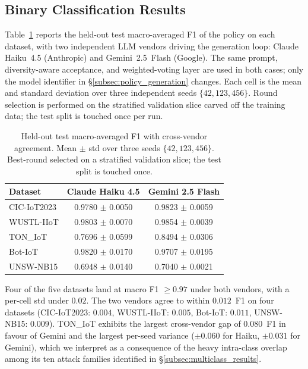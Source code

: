 \subsection{Binary Classification Results}
\label{subsec:binary_results}

Table~\ref{tab:policy_refinement} reports the held-out test macro-averaged F1
of the policy on each dataset, with two independent LLM vendors driving the
generation loop: Claude Haiku~4.5 (Anthropic) and Gemini~2.5~Flash (Google).
The same prompt, diversity-aware acceptance, and weighted-voting layer are
used in both cases; only the model identifier in
\S\ref{subsec:policy_generation} changes. Each cell is the mean and standard
deviation over three independent seeds $\{42, 123, 456\}$. Round selection
is performed on the stratified validation slice carved off the training
data; the test split is touched once per run.

\begin{table}[H]
\centering
\caption{Held-out test macro-averaged F1 with cross-vendor agreement.
  Mean $\pm$ std over three seeds $\{42, 123, 456\}$.
  Best-round selected on a stratified validation slice; the test split is touched once.}
\label{tab:policy_refinement}
\begin{tabular}{lcc}
\toprule
\textbf{Dataset} & \textbf{Claude Haiku 4.5} & \textbf{Gemini 2.5 Flash} \\
\midrule
CIC-IoT2023 & 0.9780 $\pm$ 0.0050 & 0.9823 $\pm$ 0.0059 \\
WUSTL-IIoT  & 0.9803 $\pm$ 0.0070 & 0.9854 $\pm$ 0.0039 \\
TON\_IoT    & 0.7696 $\pm$ 0.0599 & 0.8494 $\pm$ 0.0306 \\
Bot-IoT     & 0.9820 $\pm$ 0.0170 & 0.9707 $\pm$ 0.0195 \\
UNSW-NB15   & 0.6948 $\pm$ 0.0140 & 0.7040 $\pm$ 0.0021 \\
\bottomrule
\end{tabular}
\end{table}

Four of the five datasets land at macro F1 $\geq 0.97$ under both vendors,
with a per-cell std under $0.02$. The two vendors agree to within
$0.012$~F1 on four datasets (CIC-IoT2023: $0.004$, WUSTL-IIoT: $0.005$,
Bot-IoT: $0.011$, UNSW-NB15: $0.009$). TON\_IoT exhibits the largest
cross-vendor gap of $0.080$~F1 in favour of Gemini and the largest
per-seed variance ($\pm 0.060$ for Haiku, $\pm 0.031$ for Gemini), which
we interpret as a consequence of the heavy intra-class overlap among its
ten attack families identified in \S\ref{subsec:multiclass_results}.

